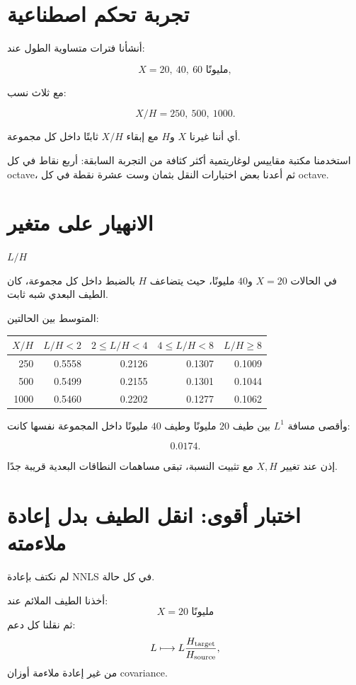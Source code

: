 \documentclass[12pt]{article}
\begin{document}
\section{تجربة تحكم اصطناعية}

أنشأنا فترات متساوية الطول عند:

\[
X=20,\ 40,\ 60\text{ مليونًا},
\]

مع ثلاث نسب:

\[
X/H=250,\ 500,\ 1000.
\]

أي أننا غيرنا \(X\) و\(H\) مع إبقاء \(X/H\) ثابتًا داخل كل مجموعة.

استخدمنا مكتبة مقاييس لوغاريتمية أكثر كثافة من التجربة السابقة:
أربع نقاط في كل octave، ثم أعدنا بعض اختبارات النقل بثمان وست عشرة
نقطة في كل octave.

\section{الانهيار على متغير } \texorpdfstring{\(L/H\)}{L/H}

في الحالات \(X=20\) و\(40\) مليونًا، حيث يتضاعف \(H\) بالضبط داخل
كل مجموعة، كان الطيف البعدي شبه ثابت.

المتوسط بين الحالتين:

\begin{center}
\begin{tabular}{rrrrr}
\toprule
\(X/H\) & \(L/H<2\) & \(2\le L/H<4\) & \(4\le L/H<8\) & \(L/H\ge8\)\\
\midrule
250  & 0.5558 & 0.2126 & 0.1307 & 0.1009\\
500  & 0.5499 & 0.2155 & 0.1301 & 0.1044\\
1000 & 0.5460 & 0.2202 & 0.1277 & 0.1062\\
\bottomrule
\end{tabular}
\end{center}

وأقصى مسافة \(L^1\) بين طيف \(20\) مليونًا وطيف \(40\) مليونًا
داخل المجموعة نفسها كانت:

\[
\boxed{0.0174}.
\]

إذن عند تغيير \(X,H\) مع تثبيت النسبة، تبقى مساهمات النطاقات البعدية
قريبة جدًا.

\section{اختبار أقوى: انقل الطيف بدل إعادة ملاءمته}

لم نكتف بإعادة NNLS في كل حالة.

أخذنا الطيف الملائم عند:
\[
X=20\text{ مليونًا}
\]
ثم نقلنا كل دعم:
\[
L\longmapsto L\frac{H_{\rm target}}{H_{\rm source}},
\]
من غير إعادة ملاءمة أوزان covariance.
\end{document}
